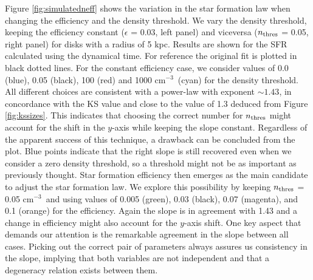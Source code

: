 \documentclass[twocolumn]{aastex}
\newcommand{\cmmm}{cm$^{-3}$}
\begin{document}
Figure \ref{fig:simulatedneff} shows the variation in the star formation law when changing the efficiency and the density threshold. We vary the density threshold, keeping the efficiency constant ($\epsilon$ = 0.03, left panel) and viceversa ($n_{\rm thres}$ = 0.05, right panel) for disks with a radius of 5 kpc. Results are shown for the SFR calculated using the dynamical time. For reference the original \citet{K98} fit is plotted in black dotted lines. For the constant efficiency case, we consider values of 0.0 (blue), 0.05 (black), 100 (red) and 1000 \cmmm~(cyan) for the density threshold. All different choices are consistent with a power-law with exponent $\sim 1.43$, in concordance with the KS value and close to the value of 1.3 deduced from Figure \ref{fig:kssizes}. This indicates that choosing the correct number for $n_{\rm thres}$ might account for the shift in the $y$-axis while keeping the slope constant. Regardless of the apparent success of this technique, a drawback can be concluded from the plot. Blue points indicate that the right slope is still recovered even when we consider a zero density threshold, so a threshold might not be as important as previously thought. Star formation efficiency then emerges as the main candidate to adjust the star formation law. We explore this possibility by keeping $n_{\rm thres}$ = 0.05 \cmmm~and using values of 0.005 (green), 0.03 (black), 0.07 (magenta), and 0.1 (orange) for the efficiency. Again the slope is in agreement with 1.43 and a change in efficiency might also account for the $y$-axis shift. One key aspect that demands our attention is the remarkable agreement in the slope between all cases. Picking out the correct pair of parameters always assures us consistency in the slope, implying that both variables are not independent and that a degeneracy relation exists between them.
\end{document}
